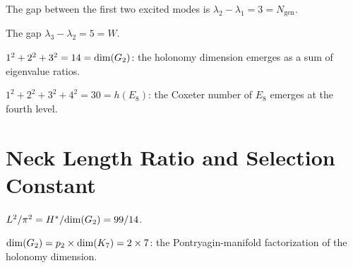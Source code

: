 \begin{theorem}[Second spectral gap $= N_{\mathrm{gen}}$]\label{thm:second_gap_Ngen}
    \leanok
    The gap between the first two excited modes is
    $\lambda_2 - \lambda_1 = 3 = N_{\mathrm{gen}}$.
\end{theorem}

\begin{theorem}[Third spectral gap $=$ Weyl factor]\label{thm:third_gap_Weyl}
    \leanok
    The gap $\lambda_3 - \lambda_2 = 5 = W$.
\end{theorem}

\begin{theorem}[Eigenvalue sum $= \opdim(\Gtwo)$]\label{thm:ev_sum_dim_G2}
    \leanok
    $1^2 + 2^2 + 3^2 = 14 = \mathrm{dim}(G_2)$: the holonomy dimension emerges
    as a sum of eigenvalue ratios.
\end{theorem}

\begin{theorem}[Eigenvalue sum $= h(E_8)$]\label{thm:ev_sum_coxeter_E8}
    \leanok
    $1^2 + 2^2 + 3^2 + 4^2 = 30 = h(E_8)$: the Coxeter number of $E_8$
    emerges at the fourth level.
\end{theorem}

\section{Neck Length Ratio and Selection Constant}

\begin{theorem}\label{thm:neck_ratio}
    \leanok
    $L^2/\pi^2 = H^*/\mathrm{dim}(G_2) = 99/14$.
\end{theorem}

\begin{theorem}\label{thm:kappa_structure}
    \leanok
    $\mathrm{dim}(G_2) = p_2 \times \mathrm{dim}(K_7) = 2 \times 7$: the Pontryagin-manifold
    factorization of the holonomy dimension.
\end{theorem}

